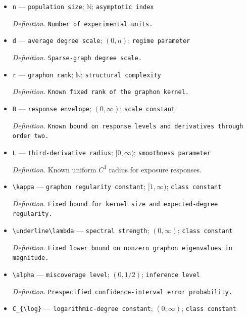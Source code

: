 \documentclass{article}
\begin{document}
\begin{itemize}
  \item \texttt{n} --- \texttt{population size}; \(\mathbb N\); \texttt{asymptotic index}
  \par\smallskip\noindent\emph{Definition.} \texttt{Number of experimental units.}
  \item \texttt{d} --- \texttt{average degree scale}; \((0,n)\); \texttt{regime parameter}
  \par\smallskip\noindent\emph{Definition.} \texttt{Sparse-\allowbreak{}graph degree scale.}
  \item \texttt{r} --- \texttt{graphon rank}; \(\mathbb N\); \texttt{structural complexity}
  \par\smallskip\noindent\emph{Definition.} \texttt{Known fixed rank of the graphon kernel.}
  \item \texttt{B} --- \texttt{response envelope}; \((0,\infty)\); \texttt{scale constant}
  \par\smallskip\noindent\emph{Definition.} \texttt{Known bound on response levels and derivatives through order two.}
  \item \texttt{L} --- \texttt{third-\allowbreak{}derivative radius}; \([0,\infty)\); \texttt{smoothness parameter}
  \par\smallskip\noindent\emph{Definition.} Known uniform \(C^3\) radius for exposure responses.
  \item \texttt{\textbackslash{}\allowbreak{}kappa} --- \texttt{graphon regularity constant}; \([1,\infty)\); \texttt{class constant}
  \par\smallskip\noindent\emph{Definition.} \texttt{Fixed bound for kernel size and expected-\allowbreak{}degree regularity.}
  \item \texttt{\textbackslash{}\allowbreak{}underline\textbackslash{}\allowbreak{}lambda} --- \texttt{spectral strength}; \((0,\infty)\); \texttt{class constant}
  \par\smallskip\noindent\emph{Definition.} \texttt{Fixed lower bound on nonzero graphon eigenvalues in magnitude.}
  \item \texttt{\textbackslash{}\allowbreak{}alpha} --- \texttt{miscoverage level}; \((0,1/2)\); \texttt{inference level}
  \par\smallskip\noindent\emph{Definition.} \texttt{Prespecified confidence-\allowbreak{}interval error probability.}
  \item \texttt{C\_\allowbreak{}\{\textbackslash{}\allowbreak{}log\}\allowbreak{}} --- \texttt{logarithmic-\allowbreak{}degree constant}; \((0,\infty)\); \texttt{class constant}

\end{itemize}
\end{document}
